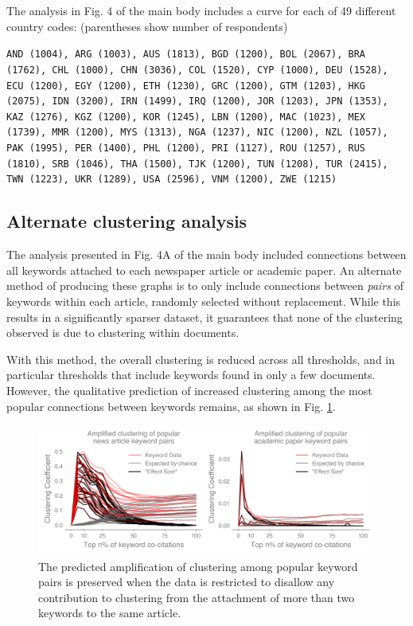 \documentclass{article}
\begin{document}
The analysis in Fig. 4 of the main body includes a curve for each of 49 different country codes: (parentheses show number of respondents)

\noindent
\texttt{AND (1004), ARG (1003), AUS (1813), BGD (1200), BOL (2067), BRA (1762), CHL (1000), CHN (3036), COL (1520), CYP (1000), DEU (1528), ECU (1200), EGY (1200), ETH (1230), GRC (1200), GTM (1203), HKG (2075), IDN (3200), IRN (1499), IRQ (1200), JOR (1203), JPN (1353), KAZ (1276), KGZ (1200), KOR (1245), LBN (1200), MAC (1023), MEX (1739), MMR (1200), MYS (1313), NGA (1237), NIC (1200), NZL (1057), PAK (1995), PER (1400), PHL (1200), PRI (1127), ROU (1257), RUS (1810), SRB (1046), THA (1500), TJK (1200), TUN (1208), TUR (2415), TWN (1223), UKR (1289), USA (2596), VNM (1200), ZWE (1215)}

\subsection{Alternate clustering analysis}
The analysis presented in Fig. 4A of the main body included connections between all keywords attached to each newspaper article or academic paper. An alternate method of producing these graphs is to only include connections between \textit{pairs} of keywords within each article, randomly selected without replacement. While this results in a significantly sparser dataset, it guarantees that none of the clustering observed is due to clustering within documents. 

With this method, the overall clustering is reduced across all thresholds, and in particular thresholds that include keywords found in only a few documents. However, the qualitative prediction of increased clustering among the most popular connections between keywords remains, as shown in Fig. \ref{fig:pairwise_clustering}.

\begin{figure}[H]
\centering
\includegraphics[width=0.8\columnwidth]{Pairwise_Clustering.png}
\caption{The predicted amplification of clustering among popular keyword pairs is preserved when the data is restricted to disallow any contribution to clustering from the attachment of more than two keywords to the same article.}
\label{fig:pairwise_clustering}
\end{figure}
\end{document}
